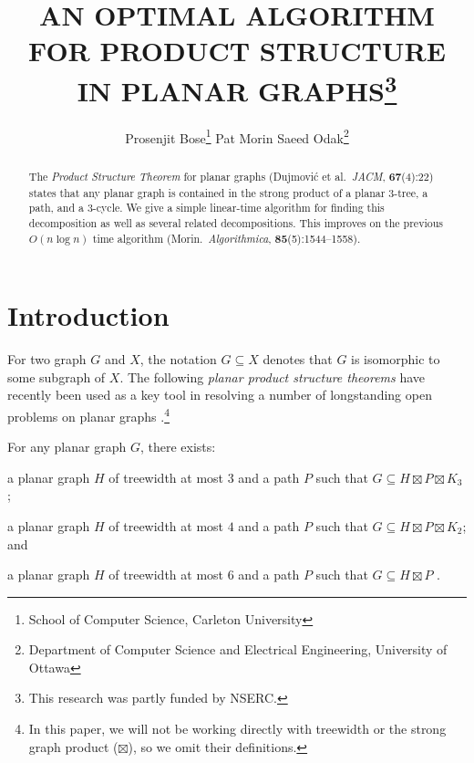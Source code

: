 \documentclass{patmorin}
\title{\MakeUppercase{An Optimal Algorithm for Product Structure in Planar Graphs}\thanks{This research was partly funded by NSERC.}}
\author{%
  Prosenjit Bose\thanks{School of Computer Science, Carleton University}\qquad
  Pat Morin\footnotemark[1]\qquad
  Saeed Odak\thanks{Department of Computer Science and Electrical Engineering, University of Ottawa}}
\date{}
\begin{document}
\maketitle

\begin{abstract}
  The \emph{Product Structure Theorem} for planar graphs (Dujmović et al.\ \emph{JACM}, \textbf{67}(4):22) states that any planar graph is contained in the strong product of a planar $3$-tree, a path, and a $3$-cycle.  We give a simple linear-time algorithm for finding this decomposition as well as several related decompositions.  This improves on the previous $O(n\log n)$ time algorithm (Morin.\ \emph{Algorithmica}, \textbf{85}(5):1544--1558).
\end{abstract}

%

\section{Introduction}

For two graph $G$ and $X$, the notation $G\subseteq X$ denotes that $G$ is isomorphic to some subgraph of $X$.
The following \emph{planar product structure theorems} have recently been used as a key tool in resolving a number of longstanding open problems on planar graphs \cite{dujmovic.esperet.ea:adjacency,dujmovic.joret.ea:planar,dujmovic.esperet.ea:planar,debski.felsner.ea:improved}.\footnote{In this paper, we will not be working directly with treewidth or the strong graph product ($\boxtimes$), so we omit their definitions.}


\begin{thm}\label{meta}
  For any planar graph $G$, there exists:
  \begin{compactenum}[(a)]
    \item \label{three_tree} a planar graph $H$ of treewidth at most $3$ and a path $P$ such that $G\subseteq H\boxtimes P\boxtimes K_3$ \cite{dujmovic.joret.ea:planar};
    \item \label{four_tree} a planar graph $H$ of treewidth at most $4$ and a path $P$ such that $G\subseteq H\boxtimes P\boxtimes K_2$; and
    \item \label{six_tree} a planar graph $H$ of treewidth at most $6$ and a path $P$ such that $G\subseteq H\boxtimes P$ \cite{ueckerdt.wood.ea:improved}.
  \end{compactenum}
\end{thm}
\end{document}
